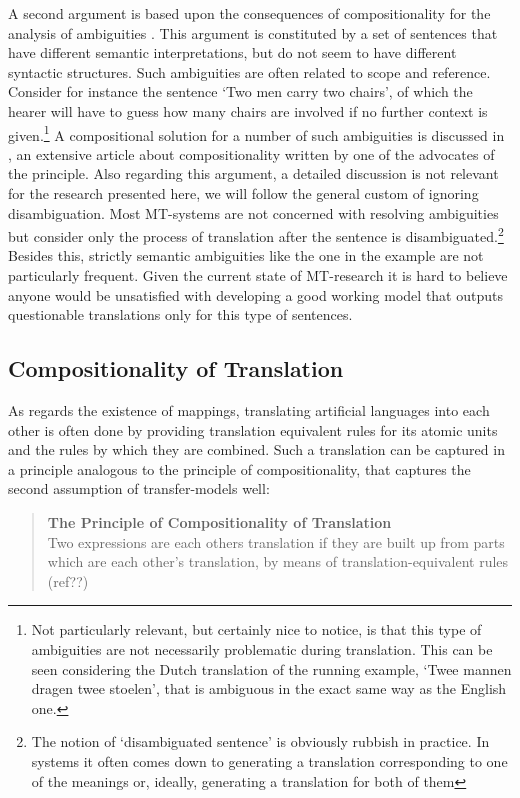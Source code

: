 \documentclass[a4paper, 11pt]{report}
\theoremstyle{definition}
\theoremstyle{plain}
\begin{document}
A second argument is based upon the consequences of compositionality for the analysis of ambiguities \cite{pelletier1994principle}. This argument is constituted by a set of sentences that have different semantic interpretations, but do not seem to have different syntactic structures. Such ambiguities are often related to scope and reference. Consider for instance the sentence `Two men carry two chairs', of which the hearer will have to guess how many chairs are involved if no further context is given.\footnote{Not particularly relevant, but certainly nice to notice, is that this type of ambiguities are not necessarily problematic during translation. This can be seen considering the Dutch translation of the running example, `Twee mannen dragen twee stoelen', that is ambiguous in the exact same way as the English one.} A compositional solution for a number of such ambiguities is discussed in \cite{janssen1996compositionality}, an extensive article about compositionality written by one of the advocates of the principle. Also regarding this argument, a detailed discussion is not relevant for the research presented here, we will follow the general custom of ignoring disambiguation. Most MT-systems are not concerned with resolving ambiguities but consider only the process of translation after the sentence is disambiguated.\footnote{The notion of `disambiguated sentence' is obviously rubbish in practice. In systems it often comes down to generating a translation corresponding to one of the meanings or, ideally, generating a translation for both of them} Besides this, strictly semantic ambiguities like the one in the example are not particularly frequent. Given the current state of MT-research it is hard to believe anyone would be unsatisfied with developing a good working model that outputs questionable translations only for this type of sentences.

\subsection{Compositionality of Translation}

As regards the existence of mappings, translating artificial languages into each other is often done by providing translation equivalent rules for its atomic units and the rules by which they are combined. Such a translation can be captured in a principle analogous to the principle of compositionality, that captures the second assumption of transfer-models well:

\begin{quote}
\textbf{The Principle of Compositionality of Translation}\\
Two expressions are each others translation if they are built up from parts which are each other's translation, by means of translation-equivalent rules (ref??)
\end{quote}
\end{document}
